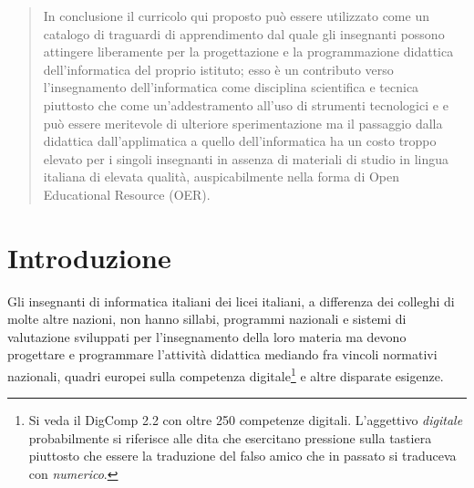 \documentclass[a4paper]{easychair}
\begin{document}
\begin{abstract}
In conclusione il curricolo qui proposto può essere utilizzato come un
catalogo di traguardi di apprendimento dal quale gli insegnanti possono attingere liberamente
per la progettazione e la programmazione didattica dell'informatica %
del proprio istituto; esso è un contributo verso l'insegnamento dell'informatica come disciplina
scientifica e tecnica piuttosto che come un'addestramento all'uso di strumenti tecnologici e
e può essere meritevole di ulteriore sperimentazione ma il passaggio dalla didattica dall'applimatica
a quello dell'informatica ha un costo troppo elevato per i singoli insegnanti
in assenza di materiali di studio in lingua italiana di elevata qualità,
auspicabilmente nella forma di Open Educational Resource (OER).
\end{abstract}

\clearpage

\setcounter{tocdepth}{2}

{\small
\tableofcontents}

\section{Introduzione}
\label{sect:introduction}

Gli insegnanti di informatica italiani dei licei italiani, a differenza dei colleghi di molte
altre nazioni, non hanno sillabi, programmi nazionali e sistemi di valutazione
sviluppati per l'insegnamento della loro materia ma devono
progettare e programmare l'attività didattica mediando fra vincoli normativi nazionali,
quadri europei sulla competenza digitale\footnote{Si veda il DigComp 2.2 con oltre 250 competenze digitali. L'aggettivo \textit{digitale} probabilmente si riferisce alle dita che esercitano pressione sulla tastiera piuttosto che essere la traduzione del falso amico che in passato si traduceva con \textit{numerico}.} 
e altre  disparate esigenze.
\end{document}
